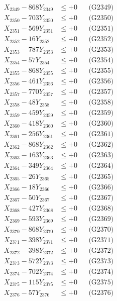 \documentclass[a4paper,10pt]{article}
\begin{document}
{\begin{align}
X_{2349} - 868Y_{2349} &\leq +0 && \text{(G2349)} \\
X_{2350} - 703Y_{2350} &\leq +0 && \text{(G2350)} \\
\allowbreak
X_{2351} - 569Y_{2351} &\leq +0 && \text{(G2351)} \\
X_{2352} - 16Y_{2352} &\leq +0 && \text{(G2352)} \\
X_{2353} - 787Y_{2353} &\leq +0 && \text{(G2353)} \\
X_{2354} - 57Y_{2354} &\leq +0 && \text{(G2354)} \\
X_{2355} - 868Y_{2355} &\leq +0 && \text{(G2355)} \\
X_{2356} - 461Y_{2356} &\leq +0 && \text{(G2356)} \\
X_{2357} - 770Y_{2357} &\leq +0 && \text{(G2357)} \\
X_{2358} - 48Y_{2358} &\leq +0 && \text{(G2358)} \\
X_{2359} - 459Y_{2359} &\leq +0 && \text{(G2359)} \\
X_{2360} - 418Y_{2360} &\leq +0 && \text{(G2360)} \\
\allowbreak
X_{2361} - 256Y_{2361} &\leq +0 && \text{(G2361)} \\
X_{2362} - 868Y_{2362} &\leq +0 && \text{(G2362)} \\
X_{2363} - 163Y_{2363} &\leq +0 && \text{(G2363)} \\
X_{2364} - 349Y_{2364} &\leq +0 && \text{(G2364)} \\
X_{2365} - 26Y_{2365} &\leq +0 && \text{(G2365)} \\
X_{2366} - 18Y_{2366} &\leq +0 && \text{(G2366)} \\
X_{2367} - 50Y_{2367} &\leq +0 && \text{(G2367)} \\
X_{2368} - 427Y_{2368} &\leq +0 && \text{(G2368)} \\
X_{2369} - 593Y_{2369} &\leq +0 && \text{(G2369)} \\
X_{2370} - 868Y_{2370} &\leq +0 && \text{(G2370)} \\
\allowbreak
X_{2371} - 398Y_{2371} &\leq +0 && \text{(G2371)} \\
X_{2372} - 398Y_{2372} &\leq +0 && \text{(G2372)} \\
X_{2373} - 572Y_{2373} &\leq +0 && \text{(G2373)} \\
X_{2374} - 702Y_{2374} &\leq +0 && \text{(G2374)} \\
X_{2375} - 115Y_{2375} &\leq +0 && \text{(G2375)} \\
X_{2376} - 57Y_{2376} &\leq +0 && \text{(G2376)} \\

\end{align}}
\end{document}
